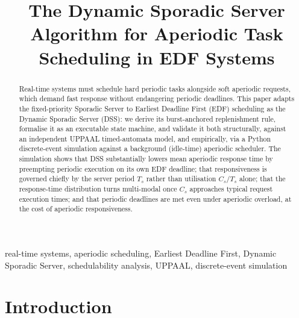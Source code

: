 \documentclass[conference]{IEEEtran}
\begin{document}
    \title{The Dynamic Sporadic Server Algorithm for Aperiodic Task Scheduling in EDF Systems}

    \author{
    }


    \maketitle
    \thispagestyle{plain}
    \pagestyle{plain}
    \setcounter{page}{1}

    \begin{abstract}
        Real-time systems must schedule hard periodic tasks alongside soft aperiodic requests, which demand fast response without endangering periodic deadlines. This paper adapts the fixed-priority Sporadic Server to Earliest Deadline First (EDF) scheduling as the Dynamic Sporadic Server (DSS): we derive its burst-anchored replenishment rule, formalise it as an executable state machine, and validate it both structurally, against an independent UPPAAL timed-automata model, and empirically, via a Python discrete-event simulation against a background (idle-time) aperiodic scheduler. The simulation shows that DSS substantially lowers mean aperiodic response time by preempting periodic execution on its own EDF deadline; that responsiveness is governed chiefly by the server period $T_s$ rather than utilisation $C_s/T_s$ alone; that the response-time distribution turns multi-modal once $C_s$ approaches typical request execution times; and that periodic deadlines are met even under aperiodic overload, at the cost of aperiodic responsiveness.
    \end{abstract}

    \begin{IEEEkeywords}
        real-time systems, aperiodic scheduling, Earliest Deadline First, Dynamic Sporadic Server, schedulability analysis, UPPAAL, discrete-event simulation
    \end{IEEEkeywords}


    \section{Introduction}
\end{document}
